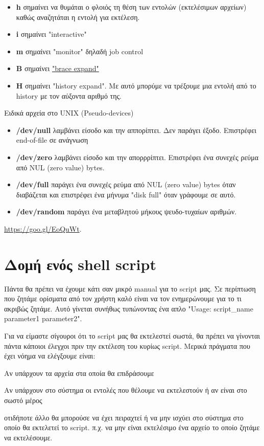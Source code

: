 \begin{itemize}
	\item \textbf{h} σημαίνει να θυμάται ο φλοιός τη θέση των εντολών (εκτελέσιμων αρχείων) καθώς αναζητάται η εντολή για εκτέλεση.
	\item \textbf{i} σημαίνει "interactive"	
	\item \textbf{m} σημαίνει "monitor" δηλαδή job control
	\item \textbf{B} σημαίνει \href{http://wiki.bash-hackers.org/syntax/expansion/brace}{"brace expand"}
	\item \textbf{H} σημαίνει "history expand". Με αυτό μπορύμε να τρέξουμε μια εντολή από το history με τον αύξοντα αριθμό της.
\end{itemize}

\begin{mybox}{Ειδικά αρχεία στο UNIX (Pseudo-devices)}
\begin{itemize}
	\item \textbf{/dev/null}  λαμβάνει είσοδο και την αππορίπτει. Δεν παράγει έξοδο. Επιστρέφει end-of-file σε ανάγνωση
	\item \textbf{/dev/zero}  λαμβάνει είσοδο και την απορρρίπτει. Επιστρέφει ένα συνεχές ρεύμα από NUL (zero value) bytes.
	\item \textbf{/dev/full}   παράγει ένα συνεχές ρεύμα από NUL (zero value) bytes όταν διαβάζεται και επιστρέφει ένα μήνυμα "disk full" όταν γράφουμε σε αυτό.
	\item \textbf{/dev/random}   παράγει ένα μεταβλητού μήκους ψευδο-τυχαίων αριθμών. 
\end{itemize}
 \href{https://goo.gl/EoQuWt}{https://goo.gl/EoQuWt}. 	
\end{mybox}

\section*{Δομή ενός shell script}
Πάντα θα πρέπει να έχουμε κάτι σαν μικρό manual για το script μας. Σε περίπτωση που ζητάμε ορίσματα από τον χρήστη καλό είναι να τον ενημερώνουμε για το τι ακριβώς ζητάμε.
Αυτό γίνεται συνήθως τυπώνοντας ένα απλο "Usage: script\_name parameter1 parameter2".

Για να είμαστε σίγουροι ότι το script μας θα εκτελεστεί σωστά, θα πρέπει να γίνονται πάντα κάποιοι έλεγχοι πριν την εκτέλεση του κυρίως script. 
Μερικά πράγματα που έχει νόημα να ελέγξουμε είναι:
\begin{packed_item}
	\item Αν υπάρχουν τα αρχεία στα οποία θα επιδράσουμε
	\item Αν υπάρχουν στο σύστημα οι εντολές που θέλουμε να εκτελεστούν ή αν είναι στο σωστό μέρος
	\item οτιδήποτε άλλο θα μπορούσε να έχει πειραχτεί ή να μην ισχύει στο σύστημα στο οποίο θα εκτελετεί το script. π.χ. να μην είναι εκτελέσιμο ένα αρχείο το οποίο ζητάμε να εκτελέσουμε.
\end{packed_item}

